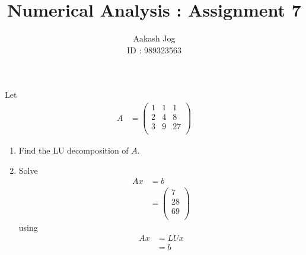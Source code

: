 \documentclass[fleqn, a4paper, 11pt, oneside]{amsart}
\title{Numerical Analysis : Assignment 7}
\author
{
	Aakash Jog\\
	ID : 989323563
}
\date{\formatdate{1}{12}{2015}}
\theoremstyle{definition}
\theoremstyle{theorem}
\begin{document}

\maketitle

\begin{question}
	Let
	\begin{align*}
		A &=
			\begin{pmatrix}
				1 & 1 & 1  \\
				2 & 4 & 8  \\
				3 & 9 & 27 \\
			\end{pmatrix}
	\end{align*}
	\begin{enumerate}
		\item
			Find the LU decomposition of $A$.
		\item
			Solve
			\begin{align*}
				A x &= b\\
				&=
					\begin{pmatrix}
						7  \\
						28 \\
						69 \\
					\end{pmatrix}
			\end{align*}
			using
			\begin{align*}
				A x & = L U x \\
                                    & = b
			\end{align*}
	\end{enumerate}
\end{question}
\end{document}
